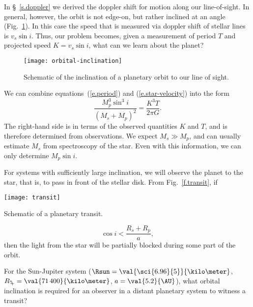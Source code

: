 In \S~\ref{s.doppler} we derived the doppler shift for motion along our line-of-sight.
In general, however, the orbit is not edge-on, but rather inclined at an angle (Fig.~\ref{f.orbital-inclination}).
In this case the speed that is measured via doppler shift of stellar lines is $v_{s}\sin i$.  Thus, our problem becomes, given a measurement of period $T$ and projected speed $K = v_{s}\sin i$, what can we learn about the planet?

\begin{figure}[ht]
\forceversofloat
\texttt{[image: orbital-inclination]}
\caption[Schematic of the inclination of a planetary orbit]{Schematic of the inclination of a planetary orbit to our line of sight.}
\label{f.orbital-inclination}
\end{figure}

We can combine equations~(\ref{e.period}) and (\ref{e.star-velocity}) into the form
\begin{equation}\label{e.mass-fcn}
	\frac{M_{p}^{3}\sin^{3}i}{(M_{s}+M_{p})^{2}} = \frac{K^{3}T}{2\pi G}.
\end{equation}
The right-hand side is in terms of the observed quantities $K$ and $T$, and is therefore determined from observations.  We expect $M_{s} \gg M_{p}$, and can usually estimate $M_{s}$ from spectroscopy of the star.  Even with this information, we can only determine $M_{p}\sin i$.

For systems with sufficiently large inclination, we will observe the planet to  the star, that is, to pass in front of the stellar disk. From Fig.~\ref{f.transit}, if
\begin{marginfigure}
\texttt{[image: transit]}
\caption[Schematic of a planetary transit]{Schematic of a planetary transit.}
\label{f.transit}
\end{marginfigure}
\[	\cos i < \frac{R_{s}+R_{p}}{a},	\]
then the light from the star will be partially blocked during some part of the orbit.

\begin{exercisebox}
For the Sun-Jupiter system ($\Rsun = \val{\sci{6.96}{5}}{\kilo\meter}$, $R_{\jupiter}=\val{71\,400}{\kilo\meter}$, $a = \val{5.2}{\AU}$), what orbital inclination is required for an observer in a distant planetary system to witness a transit?
\end{exercisebox}

